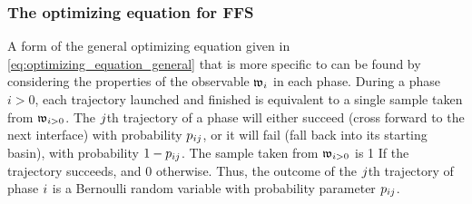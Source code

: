 \subsubsection{The optimizing equation for FFS}
\label{sec:opt_eq_for_ffs}
%
%
A form of the general optimizing equation given in \eqref{eq:optimizing_equation_general} that is more specific to  can be found by considering the properties of the observable $\mathfrak{w}_{i}$ in each phase. During a phase $i>0$, each trajectory launched and finished is equivalent to a single sample taken from $\mathfrak{w}_{i>0}$. The $j$th trajectory of a phase will either succeed (\ie cross forward to the next interface) with probability $p_{i j}$, or it will fail (\ie fall back into its starting basin), with probability $1 - p_{i j}$. The sample taken from $\mathfrak{w}_{i>0}$ is 1 If the trajectory succeeds, and 0 otherwise. Thus, the outcome of the $j$th trajectory of phase $i$ is a Bernoulli random variable with probability parameter $p_{i j}$.

